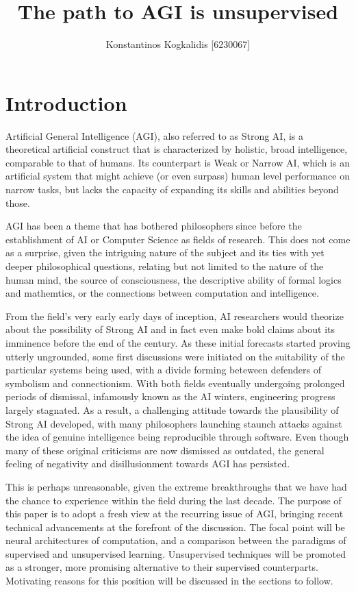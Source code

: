 \documentclass[]{article}
\begin{document}
\author{Konstantinos Kogkalidis [6230067]}
\title{The path to AGI is unsupervised}
\maketitle

\section{Introduction}
Artificial General Intelligence (AGI), also referred to as Strong AI, is a theoretical artificial construct that is characterized by holistic, broad intelligence, comparable to that of humans. Its counterpart is Weak or Narrow AI, which is an artificial system that might achieve (or even surpass) human level performance on narrow tasks, but lacks the capacity of expanding its skills and abilities beyond those.

AGI has been a theme that has bothered philosophers since before the establishment of AI or Computer Science as fields of research. This does not come as a surprise, given the intriguing nature of the subject and its ties with yet deeper philosophical questions, relating but not limited to the nature of the human mind, the source of consciousness, the descriptive ability of formal logics and mathemtics, or the connections between computation and intelligence. 

From the field's very early early days of inception, AI researchers would theorize about the possibility of Strong AI and in fact even make bold claims about its imminence before the end of the century. As these initial forecasts started proving utterly ungrounded, some first discussions were initiated on the suitability of the particular systems being used, with a divide forming beteween defenders of symbolism and connectionism. With both fields eventually undergoing prolonged periods of dismissal, infamously known as the AI winters, engineering progress largely stagnated. As a result, a challenging attitude towards the plausibility of Strong AI developed, with many philosophers launching staunch attacks against the idea of genuine intelligence being reproducible through software. Even though many of these original criticisms are now dismissed as outdated, the general feeling of negativity and disillusionment towards AGI has persisted. 

This is perhaps unreasonable, given the extreme breakthroughs that we have had the chance to experience within the field during the last decade. The purpose of this paper is to adopt a fresh view at the recurring issue of AGI, bringing recent technical advancements at the forefront of the discussion. The focal point will be neural architectures of computation, and a comparison between the paradigms of supervised and unsupervised learning. Unsupervised techniques will be promoted as a stronger, more promising alternative to their supervised counterparts. Motivating reasons for this position will be discussed in the sections to follow.
\end{document}
